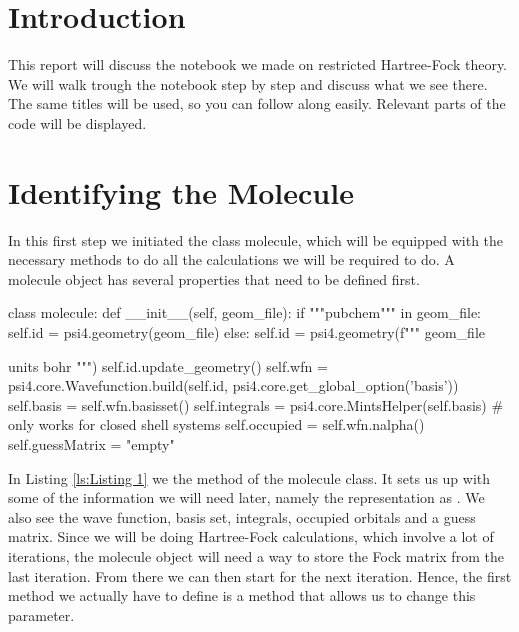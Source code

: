 \section{Introduction}
\label{sec:intro}
This report will discuss the notebook we made on restricted Hartree-Fock theory.
 We will walk trough the notebook step by step and discuss what we see there. 
 The same titles will be used, so you can follow along easily. 
 Relevant parts of the code will be displayed.

\section{Identifying the Molecule}
\label{sec:step1}
In this first step we initiated the class molecule, which will be equipped with 
the necessary methods to do all the calculations we will be required to do. 
A molecule object has several properties that need to be defined first. 


\begin{python}[caption={intitialising the molecule object},label={ls:Listing 1}]
    class molecule:
        def __init__(self, geom_file):
            if """pubchem""" in geom_file:
                self.id = psi4.geometry(geom_file)
            else:
                self.id = psi4.geometry(f"""
                {geom_file}
            
                units bohr
                """)
            self.id.update_geometry()
            self.wfn =  psi4.core.Wavefunction.build(self.id, 
                            psi4.core.get_global_option('basis'))
            self.basis = self.wfn.basisset()
            self.integrals = psi4.core.MintsHelper(self.basis)
            # only works for closed shell systems
            self.occupied = self.wfn.nalpha()  
            self.guessMatrix = "empty"
    
\end{python}
  

In Listing \ref{ls:Listing 1} we the  method of the 
molecule class. It sets us up with some of the information we will need later, 
namely the  representation as 
. We also see the wave function, basis set, 
integrals, occupied orbitals and a guess matrix. 
Since we will be doing Hartree-Fock calculations, which involve a 
lot of iterations, the molecule object will need a way to store the Fock 
matrix from the last iteration. From there we can then start for the next 
iteration. Hence, the first method we actually have to define is a method that 
allows us to change this parameter.


